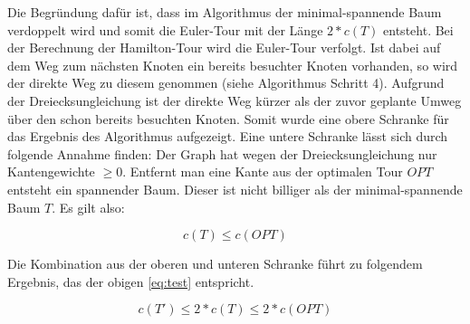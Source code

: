 \documentclass{article}
\begin{document}
Die Begründung dafür ist, dass im Algorithmus der minimal-spannende Baum verdoppelt wird und somit die Euler-Tour mit der Länge $2 * c(T)$ entsteht. Bei der Berechnung der Hamilton-Tour wird die Euler-Tour verfolgt. Ist dabei auf dem Weg zum nächsten Knoten ein bereits besuchter Knoten vorhanden, so wird der direkte Weg zu diesem genommen (siehe Algorithmus Schritt 4). Aufgrund der Dreiecksungleichung ist der direkte Weg kürzer als der zuvor geplante Umweg über den schon bereits besuchten Knoten. Somit wurde eine obere Schranke für das Ergebnis des Algorithmus aufgezeigt. Eine untere Schranke lässt sich durch folgende Annahme finden: Der Graph hat wegen der Dreiecksungleichung nur Kantengewichte $\geq0$. Entfernt man eine Kante aus der optimalen Tour $OPT$ entsteht ein spannender Baum. Dieser ist nicht billiger als der minimal-spannende Baum $T$. Es gilt also:

\begin{equation}
c(T) \leq c(OPT)
\end{equation}

Die Kombination aus der oberen und unteren Schranke führt zu folgendem Ergebnis, das der obigen \autoref{eq:test} entspricht.

\begin{equation}
c(T') \leq 2 * c(T) \leq 2 * c(OPT)
\end{equation}



%
%
%
\nocite{busing2010graphen}
\nocite{jungnickel1994graphen}
\printbibliography[heading=bibnumbered,title={Literatur}]
\end{document}
